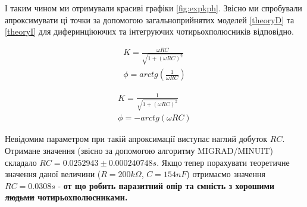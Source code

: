 І таким чином ми отримували красиві графіки \ref{fig:expkph}. Звісно ми спробували апроксимувати ці точки за допомогою загальноприйнятих моделей \ref{theoryD} та \ref{theoryI} для диферинціюючих та інтегруючих чотирьохполюсників відповідно. 

\begin{equation}
	\begin{aligned}
		K = \frac{\omega RC}{\sqrt{1+(\omega R C)^2}}\\
		\phi = arctg(\frac{1}{\omega RC})
	\end{aligned}
	\label{theoryD}
\end{equation}

\begin{equation}
	\begin{aligned}
		K = \frac{1}{\sqrt{1+(\omega R C)^2}}\\
		\phi = -arctg(\omega RC)
	\end{aligned}
	\label{theoryI}
\end{equation}

Невідомим параметром при такій апроксимації виступає наглий добуток $RC$. Отримане значення (звісно за допомогою алгоритму MIGRAD/MINUIT) складало $RC = 0.0252943 \pm  0.000240748 s$. 
Якщо тепер порахувати теоретичне значення даної величини ($R = 200k\Omega$, $C = 154nF$) отримаємо значення $RC = 0.0308 s$ - \textbf{от що робить паразитний опір та ємність з хорошими \sout{людьми} чотирьохполюсниками.}

